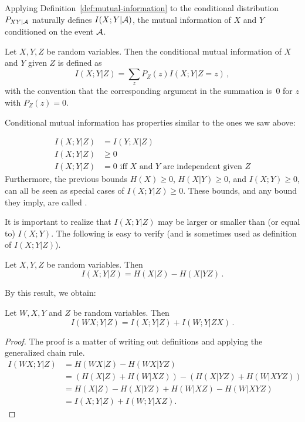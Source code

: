 Applying Definition~\ref{def:mutual-information} to the conditional distribution $P_{XY|\cal A}$ naturally defines $I(X;Y|{\cal A})$, the mutual information of $X$ and $Y$ conditioned on the event $\cal A$.

\begin{definition}
Let $X,Y,Z$ be random variables. Then the conditional mutual
information of $X$ and $Y$ given $Z$ is defined as
\[
I(X;Y| Z) = \sum_z P_Z(z) I(X;Y|Z\!=\!z) \, ,
\]
with the convention that the corresponding argument in the summation is~$0$ for $z$ with $P_Z(z)=0$. 
\end{definition}
%
Conditional mutual information has properties similar to the ones we saw above:

\begin{align}
I(X;Y|Z) &= I(Y;X|Z)\\
I(X;Y|Z) &\geq 0\\
I(X;Y|Z) &= 0 \mbox{ iff $X$ and $Y$ are independent given $Z$}
\end{align}
Furthermore, the previous bounds $H(X) \geq 0$, $H(X|Y) \geq 0$, and  $I(X;Y) \geq 0$, can all be seen as special cases of $I(X;Y| Z) \geq 0$. These bounds, and any bound they imply, are called .

It is important to realize that $I(X;Y| Z)$ may be larger or smaller than (or equal to) $I(X;Y)$. 
The following is easy to verify (and is sometimes used as definition of $I(X;Y| Z)$). 
\begin{proposition}
Let $X,Y,Z$ be random variables. Then 
\[
I(X;Y| Z)= H(X|Z)- H(X|YZ) \, .
\]
\end{proposition}
%
By this result, we obtain: 


\begin{corollary}
Let $W,X,Y$ and $Z$ be random variables. Then
\[
I(WX;Y|Z) = I(X;Y|Z)+ I(W;Y|ZX) \, .
\]
\end{corollary}
\begin{proof}
The proof is a matter of writing out definitions and applying the generalized chain rule.
\begin{align}
I(WX;Y|Z) &= H(WX|Z) - H(WX|YZ)\nonumber\\
&= (H(X|Z) + H(W | XZ)) - (H(X|YZ) + H(W|XYZ))\nonumber\\
&= H(X|Z) - H(X|YZ) + H(W|XZ) - H(W|XYZ)\nonumber\\
&= I(X;Y|Z) + I(W;Y|XZ).
\end{align}
\end{proof}

